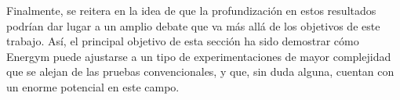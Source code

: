 \begin{table}
    \centering
    \caption{Resultados obtenidos en la validación de DDPG entrenado en \textit{mixed} y DDPG entrenado en \textit{hot} y \textit{cool} sobre el entorno \textit{continuous-mixed}}
    \label{tb:cv-learning}
\end{table}

Finalmente, se reitera en la idea de que la profundización en estos resultados podrían dar lugar a un amplio debate que va más allá de los objetivos de este trabajo. Así, el principal objetivo de esta sección ha sido demostrar cómo Energym puede ajustarse a un tipo de experimentaciones de mayor complejidad que se alejan de las pruebas convencionales, y que, sin duda alguna, cuentan con un enorme potencial en este campo.
